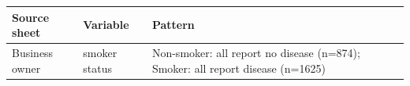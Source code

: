 \begin{tabular}{llp{9cm}}
\toprule
Source sheet & Variable & Pattern \\
\midrule
Business owner & smoker status & Non-smoker: all report no disease (n=874); Smoker: all report disease (n=1625) \\
\bottomrule
\end{tabular}
